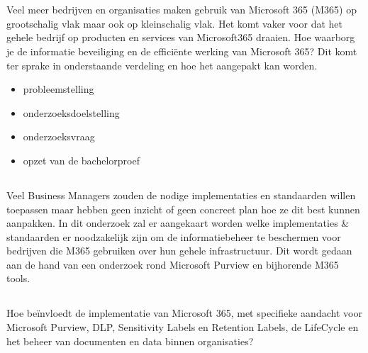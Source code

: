 
\chapter{}%
\label{ch:inleiding}

Veel meer bedrijven en organisaties maken gebruik van Microsoft 365 (M365) op grootschalig vlak maar ook op kleinschalig vlak.
Het komt vaker voor dat het gehele bedrijf op producten en services van Microsoft365 draaien. Hoe waarborg je de informatie beveiliging en de efficiënte werking van Microsoft 365?
Dit komt ter sprake in onderstaande verdeling en hoe het aangepakt kan worden.

\begin{itemize}
  \item probleemstelling
  \item onderzoeksdoelstelling
  \item onderzoeksvraag
  \item opzet van de bachelorproef
\end{itemize}

\section{}%
\label{sec:probleemstelling}

Veel Business Managers zouden de nodige implementaties en standaarden willen toepassen maar hebben geen inzicht of geen concreet plan hoe ze dit best kunnen aanpakken.
In dit onderzoek zal er aangekaart worden welke implementaties \& standaarden er noodzakelijk zijn om de informatiebeheer te beschermen voor bedrijven die M365 gebruiken over hun gehele infrastructuur.
Dit wordt gedaan aan de hand van een onderzoek rond Microsoft Purview en bijhorende M365 tools.


\section{}%
\label{sec:onderzoeksvraag}


Hoe beïnvloedt de implementatie van Microsoft 365, met specifieke aandacht voor Microsoft Purview, DLP, Sensitivity Labels en Retention Labels, de LifeCycle en het beheer van documenten en data binnen organisaties?

